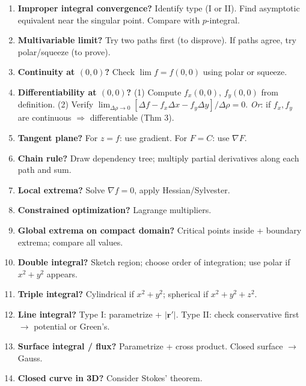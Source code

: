 \documentclass[12pt,a4paper]{article}
\theoremstyle{definition}
\theoremstyle{remark}
\newcommand{\grad}{\nabla}
\begin{document}
\begin{enumerate}
  \item \textbf{Improper integral convergence?} Identify type (I or II). Find asymptotic equivalent near the singular point. Compare with $p$-integral.
  \item \textbf{Multivariable limit?} Try two paths first (to disprove). If paths agree, try polar/squeeze (to prove).
  \item \textbf{Continuity at $(0,0)$?} Check $\lim f = f(0,0)$ using polar or squeeze.
  \item \textbf{Differentiability at $(0,0)$?} (1) Compute $f_x(0,0)$, $f_y(0,0)$ from definition. (2) Verify $\lim_{\Delta\rho\to 0}[\Delta f - f_x\Delta x - f_y\Delta y]/\Delta\rho = 0$. \emph{Or}: if $f_x,f_y$ are continuous $\Rightarrow$ differentiable (Thm 3).
  \item \textbf{Tangent plane?} For $z=f$: use gradient. For $F=C$: use $\grad F$.
  \item \textbf{Chain rule?} Draw dependency tree; multiply partial derivatives along each path and sum.
  \item \textbf{Local extrema?} Solve $\grad f=0$, apply Hessian/Sylvester.
  \item \textbf{Constrained optimization?} Lagrange multipliers.
  \item \textbf{Global extrema on compact domain?} Critical points inside + boundary extrema; compare all values.
  \item \textbf{Double integral?} Sketch region; choose order of integration; use polar if $x^2+y^2$ appears.
  \item \textbf{Triple integral?} Cylindrical if $x^2+y^2$; spherical if $x^2+y^2+z^2$.
  \item \textbf{Line integral?} Type I: parametrize + $|\mathbf{r}'|$. Type II: check conservative first $\to$ potential or Green's.
  \item \textbf{Surface integral / flux?} Parametrize + cross product. Closed surface $\to$ Gauss.
  \item \textbf{Closed curve in 3D?} Consider Stokes' theorem.
\end{enumerate}
\end{document}
